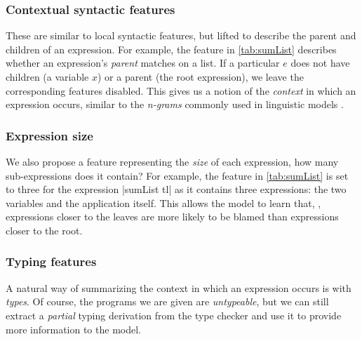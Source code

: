 \subsubsection{Contextual syntactic features}
These are similar to local syntactic features, but lifted to describe the
parent and children of an expression.
%
For example, the \IsCaseListP feature in \autoref{tab:sumList} describes
whether an expression's \emph{parent} matches on a list.
%
If a particular $e$ does not have children (\eg a variable $x$) or a
parent (\ie the root expression), we leave the corresponding features
disabled.
%
This gives us a notion of the \emph{context} in which an expression
occurs, similar to the \emph{n-grams} commonly used in linguistic
models \citep{Hindle2012-hf,Gabel2010-el}.


\subsubsection{Expression size}
We also propose a feature representing the \emph{size} of each expression,
\ie how many sub-expressions does it contain?
%
For example, the \ExprSize feature in \autoref{tab:sumList} is set to three
for the expression |sumList tl| as it contains three expressions:
the two variables and the application itself.
%
This allows the model to learn that, \eg, expressions closer to the
leaves are more likely to be blamed than expressions closer to the root.

\subsubsection{Typing features}
A natural way of summarizing the context in which an expression occurs
is with \emph{types}.
%
Of course, the programs we are given are \emph{untypeable}, but we can
still extract a \emph{partial} typing derivation from the type checker
and use it to provide more information to the model.

